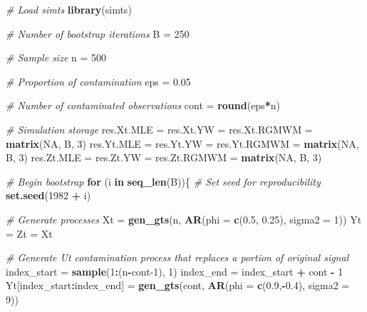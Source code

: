 \documentclass[]{book}
\newenvironment{Shaded}{\begin{snugshade}}{\end{snugshade}}
\newcommand{\CommentTok}[1]{\textcolor[rgb]{0.56,0.35,0.01}{\textit{#1}}}
\newcommand{\ControlFlowTok}[1]{\textcolor[rgb]{0.13,0.29,0.53}{\textbf{#1}}}
\newcommand{\DataTypeTok}[1]{\textcolor[rgb]{0.13,0.29,0.53}{#1}}
\newcommand{\DecValTok}[1]{\textcolor[rgb]{0.00,0.00,0.81}{#1}}
\newcommand{\FloatTok}[1]{\textcolor[rgb]{0.00,0.00,0.81}{#1}}
\newcommand{\KeywordTok}[1]{\textcolor[rgb]{0.13,0.29,0.53}{\textbf{#1}}}
\newcommand{\NormalTok}[1]{#1}
\newcommand{\OperatorTok}[1]{\textcolor[rgb]{0.81,0.36,0.00}{\textbf{#1}}}
\newcommand{\OtherTok}[1]{\textcolor[rgb]{0.56,0.35,0.01}{#1}}
\newcommand{\StringTok}[1]{\textcolor[rgb]{0.31,0.60,0.02}{#1}}
\theoremstyle{definition}
\theoremstyle{definition}
\theoremstyle{definition}
\theoremstyle{remark}
\begin{document}
\begin{Shaded}
\begin{Highlighting}[]
\CommentTok{# Load simts}
\KeywordTok{library}\NormalTok{(simts)}

\CommentTok{# Number of bootstrap iterations}
\NormalTok{B =}\StringTok{ }\DecValTok{250}

\CommentTok{# Sample size}
\NormalTok{n =}\StringTok{ }\DecValTok{500}

 \CommentTok{# Proportion of contamination}
\NormalTok{eps =}\StringTok{ }\FloatTok{0.05}       

\CommentTok{# Number of contaminated observations}
\NormalTok{cont =}\StringTok{ }\KeywordTok{round}\NormalTok{(eps}\OperatorTok{*}\NormalTok{n)   }

\CommentTok{# Simulation storage}
\NormalTok{res.Xt.MLE =}\StringTok{ }\NormalTok{res.Xt.YW =}\StringTok{ }\NormalTok{res.Xt.RGMWM =}\StringTok{ }\KeywordTok{matrix}\NormalTok{(}\OtherTok{NA}\NormalTok{, B, }\DecValTok{3}\NormalTok{)}
\NormalTok{res.Yt.MLE =}\StringTok{ }\NormalTok{res.Yt.YW =}\StringTok{ }\NormalTok{res.Yt.RGMWM =}\StringTok{ }\KeywordTok{matrix}\NormalTok{(}\OtherTok{NA}\NormalTok{, B, }\DecValTok{3}\NormalTok{)}
\NormalTok{res.Zt.MLE =}\StringTok{ }\NormalTok{res.Zt.YW =}\StringTok{ }\NormalTok{res.Zt.RGMWM =}\StringTok{ }\KeywordTok{matrix}\NormalTok{(}\OtherTok{NA}\NormalTok{, B, }\DecValTok{3}\NormalTok{)}
  
\CommentTok{# Begin bootstrap}
\ControlFlowTok{for}\NormalTok{ (i }\ControlFlowTok{in} \KeywordTok{seq_len}\NormalTok{(B))\{}
  \CommentTok{# Set seed for reproducibility}
  \KeywordTok{set.seed}\NormalTok{(}\DecValTok{1982} \OperatorTok{+}\StringTok{ }\NormalTok{i)}
  
  \CommentTok{# Generate processes}
\NormalTok{  Xt =}\StringTok{ }\KeywordTok{gen_gts}\NormalTok{(n, }\KeywordTok{AR}\NormalTok{(}\DataTypeTok{phi =} \KeywordTok{c}\NormalTok{(}\FloatTok{0.5}\NormalTok{, }\FloatTok{0.25}\NormalTok{), }\DataTypeTok{sigma2 =} \DecValTok{1}\NormalTok{))}
\NormalTok{  Yt =}\StringTok{ }\NormalTok{Zt =}\StringTok{ }\NormalTok{Xt}
  
  \CommentTok{# Generate Ut contamination process that replaces a portion of original signal}
\NormalTok{  index_start =}\StringTok{ }\KeywordTok{sample}\NormalTok{(}\DecValTok{1}\OperatorTok{:}\NormalTok{(n}\OperatorTok{-}\NormalTok{cont}\DecValTok{-1}\NormalTok{), }\DecValTok{1}\NormalTok{)}
\NormalTok{  index_end =}\StringTok{ }\NormalTok{index_start }\OperatorTok{+}\StringTok{ }\NormalTok{cont }\OperatorTok{-}\StringTok{ }\DecValTok{1}
\NormalTok{  Yt[index_start}\OperatorTok{:}\NormalTok{index_end] =}\StringTok{ }\KeywordTok{gen_gts}\NormalTok{(cont, }\KeywordTok{AR}\NormalTok{(}\DataTypeTok{phi =} \KeywordTok{c}\NormalTok{(}\FloatTok{0.9}\NormalTok{,}\OperatorTok{-}\FloatTok{0.4}\NormalTok{), }\DataTypeTok{sigma2 =} \DecValTok{9}\NormalTok{))}
  

\end{Highlighting}
\end{Shaded}
\end{document}
